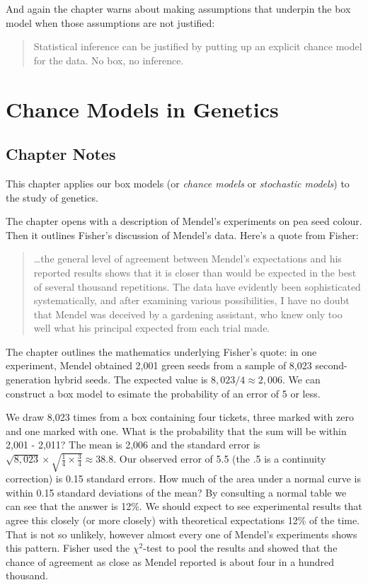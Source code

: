 \documentclass[
]{book}
\begin{document}
And again the chapter warns about making assumptions that underpin the box model when those assumptions are not justified:

\begin{quote}
Statistical inference can be justified by putting up an explicit chance model for the data. No box, no inference.
\end{quote}

\hypertarget{chance_genetics}{%
\chapter{Chance Models in Genetics}\label{chance_genetics}}

\hypertarget{chapter-notes-24}{%
\section{Chapter Notes}\label{chapter-notes-24}}

This chapter applies our box models (or \emph{chance models} or \emph{stochastic models}) to the study of genetics.

The chapter opens with a description of Mendel's experiments on pea seed colour. Then it outlines Fisher's discussion of Mendel's data. Here's a quote from Fisher:

\begin{quote}
\ldots the general level of agreement between Mendel's expectations and his reported results shows that it is closer than would be expected in the best of several thousand repetitions. The data have evidently been sophisticated systematically, and after examining various possibilities, I have no doubt that Mendel was deceived by a gardening assistant, who knew only too well what his principal expected from each trial made.
\end{quote}

The chapter outlines the mathematics underlying Fisher's quote: in one experiment, Mendel obtained 2,001 green seeds from a sample of 8,023 second-generation hybrid seeds. The expected value is \(8,023/4 \approx 2,006\). We can construct a box model to esimate the probability of an error of 5 or less.

We draw 8,023 times from a box containing four tickets, three marked with zero and one marked with one. What is the probability that the sum will be within 2,001 - 2,011? The mean is 2,006 and the standard error is \(\sqrt{8,023} \times \sqrt{\frac{1}{4} \times \frac{3}{4}} \approx 38.8\). Our observed error of 5.5 (the .5 is a continuity correction) is 0.15 standard errors. How much of the area under a normal curve is within 0.15 standard deviations of the mean? By consulting a normal table we can see that the answer is 12\%. We should expect to see experimental results that agree this closely (or more closely) with theoretical expectations 12\% of the time. That is not so unlikely, however almost every one of Mendel's experiments shows this pattern. Fisher used the \(\chi^2\)-test to pool the results and showed that the chance of agreement as close as Mendel reported is about four in a hundred thousand.
\end{document}
